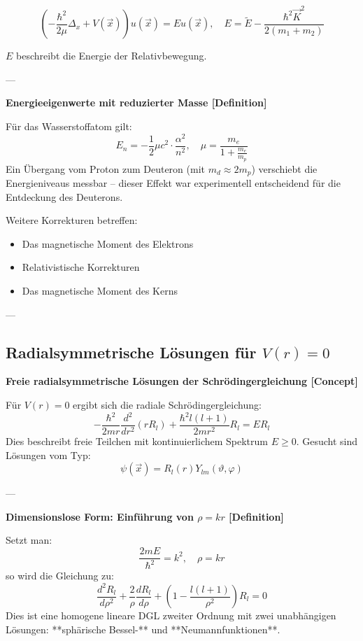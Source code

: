 \documentclass[10pt, letterpaper]{article}
\begin{document}
\[
\left( -\frac{\hbar^2}{2\mu} \Delta_x + V(\vec{x}) \right) u(\vec{x}) = E u(\vec{x}), \quad E = \tilde{E} - \frac{\hbar^2 \vec{K}^2}{2(m_1 + m_2)}
\]

$E$ beschreibt die Energie der Relativbewegung.

---

\textbf{Energieeigenwerte mit reduzierter Masse [Definition]}

Für das Wasserstoffatom gilt:
\[
E_n = -\frac{1}{2} \mu c^2 \cdot \frac{\alpha^2}{n^2}, \quad \mu = \frac{m_e}{1 + \frac{m_e}{m_p}}
\]
Ein Übergang vom Proton zum Deuteron (mit $m_d \approx 2m_p$) verschiebt die Energieniveaus messbar – dieser Effekt war experimentell entscheidend für die Entdeckung des Deuterons.

Weitere Korrekturen betreffen:
\begin{itemize}
  \item Das magnetische Moment des Elektrons
  \item Relativistische Korrekturen
  \item Das magnetische Moment des Kerns
\end{itemize}

---


\pagebreak



\subsection{Radialsymmetrische Lösungen für $V(r)=0$}

\textbf{Freie radialsymmetrische Lösungen der Schrödingergleichung [Concept]}

Für $V(r) = 0$ ergibt sich die radiale Schrödingergleichung:
\[
-\frac{\hbar^2}{2m r} \frac{d^2}{dr^2}(r R_l) + \frac{\hbar^2 l(l+1)}{2m r^2} R_l = E R_l
\]
Dies beschreibt freie Teilchen mit kontinuierlichem Spektrum $E \geq 0$. Gesucht sind Lösungen vom Typ:
\[
\psi(\vec{x}) = R_l(r) Y_{lm}(\vartheta, \varphi)
\]

---

\textbf{Dimensionslose Form: Einführung von $\rho = kr$ [Definition]}

Setzt man:
\[
\frac{2mE}{\hbar^2} = k^2, \quad \rho = kr
\]
so wird die Gleichung zu:
\[
\frac{d^2 R_l}{d\rho^2} + \frac{2}{\rho} \frac{d R_l}{d\rho} + \left(1 - \frac{l(l+1)}{\rho^2} \right) R_l = 0
\]
Dies ist eine homogene lineare DGL zweiter Ordnung mit zwei unabhängigen Lösungen: **sphärische Bessel-** und **Neumannfunktionen**.
\end{document}
